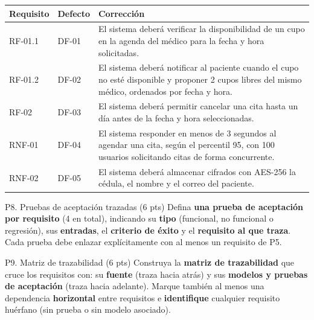 \documentclass[11pt,a4paper,oneside]{article}
\begin{document}
	\begin{center}\small
		\begin{tabularx}{\linewidth}{|L{1.8cm}|L{1.5cm}|X|}
			\hline
			\textbf{Requisito} & \textbf{Defecto} & \textbf{Correcci\'on}\\
			\hline
			RF-01.1 & DF-01 & El sistema deber\'a verificar la disponibilidad de un cupo en la agenda del m\'edico para la fecha y hora solicitadas.\\
			\hline
			RF-01.2 & DF-02 & El sistema deber\'a notificar al paciente cuando el cupo no est\'e disponible y proponer 2 cupos libres del mismo m\'edico, ordenados por fecha y hora.\\
			\hline
			RF-02 & DF-03 & El sistema deber\'a permitir cancelar una cita hasta un d\'ia antes de la fecha y hora seleccionadas.\\
			\hline
			RNF-01 & DF-04 & El sistema responder en menos de 3 segundos al agendar una cita, seg\'un el percentil 95, con 100 usuarios solicitando citas de forma concurrente.\\
			\hline
			RNF-02 & DF-05 & El sistema deber\'a almacenar cifrados con AES-256 la c\'edula, el nombre y el correo del paciente.\\
			\hline
		\end{tabularx}
	\end{center}
	
	\vspace{10pt}
	
	\begin{tarea}{P8. Pruebas de aceptaci\'on trazadas \hfill (6 pts)}
		Defina \textbf{una prueba de aceptaci\'on por requisito} (4 en total), indicando su \textbf{tipo} (funcional, no funcional o regresi\'on), sus \textbf{entradas}, el \textbf{criterio de \'exito} y el \textbf{requisito al que traza}. Cada prueba debe enlazar expl\'icitamente con al menos un requisito de P5.
	\end{tarea}
	
	
	\vspace{10pt}
	
	\begin{tarea}{P9. Matriz de trazabilidad \hfill (6 pts)}
		Construya la \textbf{matriz de trazabilidad} que cruce los requisitos con: su \textbf{fuente} (traza hacia atr\'as) y sus \textbf{modelos y pruebas de aceptaci\'on} (traza hacia adelante). Marque tambi\'en al menos una dependencia \textbf{horizontal} entre requisitos e \textbf{identifique} cualquier requisito hu\'erfano (sin prueba o sin modelo asociado).
	\end{tarea}
	
\end{document}
